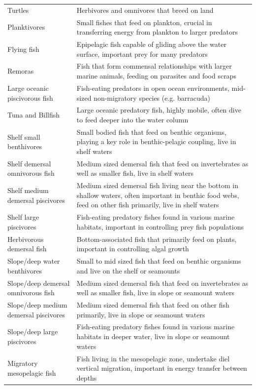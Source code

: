 \begin{longtable}{p{}p{}}
  Turtles & Herbivores and omnivores that breed on land \\
  Planktivores & Small fishes that feed on plankton, crucial in transferring energy from plankton to larger predators \\
  Flying fish & Epipelagic fish capable of gliding above the water surface, important prey for many predators \\
  Remoras & Fish that form commensal relationships with larger marine animals, feeding on parasites and food scraps \\
  Large oceanic piscivorous fish & Fish-eating predators in open ocean environments, mid-sized non-migratory species (e.g. barracuda) \\
  Tuna and Billfish & Large oceanic predatory fish, highly mobile, often dive to feed deeper into the water column \\
  Shelf small benthivores & Small bodied fish that feed on benthic organisms, playing a key role in benthic-pelagic coupling, live in shelf waters \\
  Shelf demersal omnivorous fish & Medium sized demersal fish that feed on invertebrates as well as smaller fish, live in shelf waters \\
  Shelf medium demersal piscivores & Medium sized demersal fish living near the bottom in shallow waters, often important in benthic food webs, feed on other fish primarily, live in shelf waters \\
  Shelf large piscivores & Fish-eating predatory fishes found in various marine habitats, important in controlling prey fish populations \\
  Herbivorous demersal fish & Bottom-associated fish that primarily feed on plants, important in controlling algal growth \\
  Slope/deep water benthivores & Small to mid sized fish that feed on benthic organisms and live on the shelf or seamounts \\
  Slope/deep demersal omnivorous fish & Medium sized demersal fish that feed on invertebrates as well as smaller fish, live in slope or seamount waters \\
  Slope/deep medium demersal piscivores & Medium sized demersal fish that feed on other fish primarily, live in slope or seamount waters \\
  Slope/deep large piscivores & Fish-eating predatory fishes found in various marine habitats in deeper water, live in slope or seamount waters \\
  Migratory mesopelagic fish & Fish living in the mesopelagic zone, undertake diel vertical migration, important in energy transfer between depths \\

\end{longtable}
